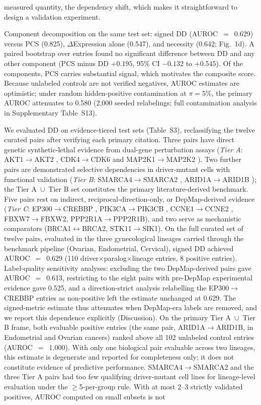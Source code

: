 \documentclass[11pt,a4paper]{article}
\begin{document}
measured quantity, the dependency shift, which makes it straightforward to design a validation experiment.

Component decomposition on the same test set: signed DD (AUROC~$=$~0.629) versus PCS (0.825), $\Delta$Expression alone (0.547), and necessity (0.642; Fig.~1d). A paired bootstrap over entries found no significant difference between DD and any other component (PCS minus DD $+0.195$, 95\% CI $-0.132$ to $+0.545$). Of the components, PCS carries substantial signal, which motivates the composite score. Because unlabeled controls are not verified negatives, AUROC estimates are optimistic; under random hidden-positive contamination at $\pi=5\%$, the primary AUROC attenuates to 0.580 (2,000 seeded relabelings; full contamination analysis in Supplementary Table~S13).

We evaluated DD on evidence-tiered test sets (Table~S3), reclassifying the twelve curated pairs after verifying each primary citation. Three pairs have direct genetic synthetic-lethal evidence from dual-gene perturbation assays (\textit{Tier A}: AKT1$\rightarrow$AKT2 \cite{Najm2018}, CDK4$\rightarrow$CDK6 and MAP2K1$\rightarrow$MAP2K2 \cite{Parrish2021}). Two further pairs are demonstrated selective dependencies in driver-mutant cells with functional validation (\textit{Tier B}: SMARCA4$\rightarrow$SMARCA2 \cite{Hoffman2014}, ARID1A$\rightarrow$ARID1B \cite{Helming2014}); the Tier A~$\cup$~Tier B set constitutes the primary literature-derived benchmark. Five pairs rest on indirect, reciprocal-direction-only, or DepMap-derived evidence (\textit{Tier C}: EP300$\rightarrow$CREBBP \cite{Ogiwara2016,Nie2021}, PIK3CA$\rightarrow$PIK3CB \cite{Wee2008}, CCNE1$\rightarrow$CCNE2 \cite{Geng2003}, FBXW7$\rightarrow$FBXW2, PPP2R1A$\rightarrow$PPP2R1B), and two serve as mechanistic comparators (BRCA1$\leftrightarrow$BRCA2, STK11$\rightarrow$SIK1). On the full curated set of twelve pairs, evaluated in the three gynecological lineages carried through the benchmark pipeline (Ovarian, Endometrial, Cervical), signed DD achieved AUROC~$=$~0.629 (110 driver$\times$paralog$\times$lineage entries, 8 positive entries). Label-quality sensitivity analyses: excluding the two DepMap-derived pairs gave AUROC~$=$~0.613, restricting to the eight pairs with pre-DepMap experimental evidence gave 0.525, and a direction-strict analysis relabelling the EP300$\rightarrow$CREBBP entries as non-positive left the estimate unchanged at 0.629. The signed-metric estimate thus attenuates when DepMap-era labels are removed, and we report this dependence explicitly (Discussion). On the primary Tier A~$\cup$~Tier B frame, both evaluable positive entries (the same pair, ARID1A$\rightarrow$ARID1B, in Endometrial and Ovarian cancers) ranked above all 102 unlabeled control entries (AUROC~$=$~1.000). With only one biological pair evaluable across two lineages, this estimate is degenerate and reported for completeness only; it does not constitute evidence of predictive performance. SMARCA4$\rightarrow$SMARCA2 and the three Tier A pairs had too few qualifying driver-mutant cell lines for lineage-level evaluation under the $\geq$5-per-group rule. With at most 2--3 strictly validated positives, AUROC computed on small subsets is not 
\end{document}
